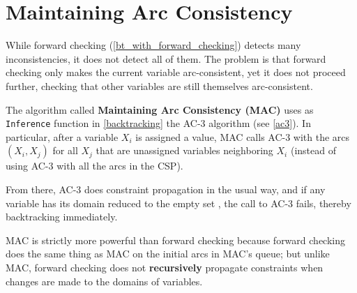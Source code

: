 \chapter{Maintaining Arc Consistency}

While forward checking (\cref{bt_with_forward_checking}) detects many inconsistencies, it does not detect all of them.
The problem is that forward checking only makes the current variable arc-consistent, yet it does not proceed further, checking that other variables are still themselves arc-consistent.

The algorithm called \textbf{Maintaining Arc Consistency (MAC)} \cite{10.1007/3-540-58601-6_86} uses as \texttt{Inference} function in \cref{backtracking} the AC-3 algorithm (see \cref{ac3}).
In particular, after a variable $X_i$ is assigned a value, MAC calls AC-3 with the arcs $(X_i, X_j)$ for all $X_j$ that are unassigned variables neighboring $X_i$ (instead of using AC-3 with all the arcs in the CSP).

From there, AC-3 does constraint propagation in the usual way, and if any variable has its domain reduced to the empty set , the call to AC-3 fails, thereby backtracking immediately.

MAC is strictly more powerful than forward checking because forward checking does the same thing as MAC on the initial arcs in MAC's queue; but unlike MAC, forward checking does not \textbf{recursively} propagate constraints when changes are made to the domains of variables.


